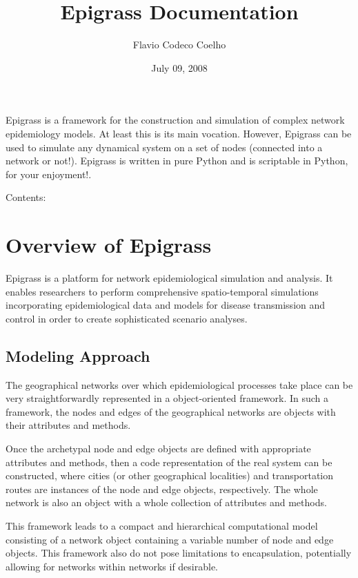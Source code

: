 \documentclass[a4paper,10pt]{manual}
\title{Epigrass Documentation}
\date{July 09, 2008}
\author{Flavio Codeco Coelho}
\begin{document}
\maketitle
\tableofcontents



Epigrass is a framework for the construction and simulation of complex network epidemiology models. At least this is its main vocation. However, Epigrass can be used to simulate any dynamical system on a set of nodes (connected into a network or not!). Epigrass is written in pure Python and is scriptable in Python, for your enjoyment!.

Contents:

\resetcurrentobjects


\chapter{Overview of Epigrass}

Epigrass is a platform for network epidemiological simulation and analysis. It enables researchers to perform comprehensive spatio-temporal simulations incorporating epidemiological data and models for disease transmission and control in order to create sophisticated scenario analyses.


\section{Modeling Approach}

The geographical networks  over which epidemiological processes take place can be very straightforwardly represented in a object-oriented framework. In such a framework, the nodes and edges of the geographical networks are objects with their attributes and methods.

Once the archetypal node and edge objects are defined with appropriate attributes and methods, then a code representation of the real system can be constructed, where cities (or other geographical localities) and transportation routes are instances of the node and edge objects, respectively. The whole network is also an object with a whole collection of attributes and methods.

This framework leads to a compact and hierarchical computational model consisting of a network object containing a variable number of node and edge objects. This framework also do not pose limitations to encapsulation, potentially allowing for networks within networks if desirable.
\end{document}
